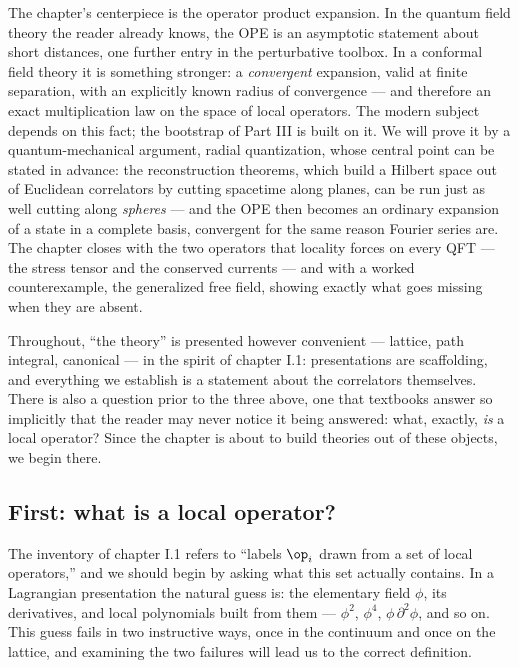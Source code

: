 \noin The chapter's centerpiece is the operator product expansion. In the
quantum field theory the reader already knows, the OPE is an asymptotic
statement about short distances, one further entry in the perturbative
toolbox. In a conformal field theory it is something stronger: a
\emph{convergent} expansion, valid at finite separation, with an explicitly
known radius of convergence --- and therefore an exact multiplication law on
the space of local operators. The modern subject depends on this fact; the
bootstrap of Part III is built on it. We will prove it by a
quantum-mechanical argument, radial quantization, whose central point can be
stated in advance: the reconstruction theorems, which build a Hilbert space
out of Euclidean correlators by cutting spacetime along planes, can be run
just as well cutting along \emph{spheres} --- and the OPE then becomes an
ordinary expansion of a state in a complete basis, convergent for the same
reason Fourier series are. The chapter closes with the two operators that
locality forces on every QFT --- the stress tensor and the conserved currents
--- and with a worked counterexample, the generalized free field, showing
exactly what goes missing when they are absent.

Throughout, ``the theory'' is presented however convenient --- lattice, path
integral, canonical --- in the spirit of chapter I.1: presentations are
scaffolding, and everything we establish is a statement about the correlators
themselves. There is also a question prior to the three above, one that
textbooks answer so implicitly that the reader may never notice it being
answered: what, exactly, \emph{is} a local operator? Since the chapter is
about to build theories out of these objects, we begin there.

\subsection{First: what is a local operator?}
\label{sec:what-is-operator}

The inventory of chapter I.1 refers to ``labels $\op_i$ drawn from a set of
local operators,'' and we should begin by asking what this set actually
contains. In a Lagrangian presentation the natural guess is: the elementary
field $\phi$, its derivatives, and local polynomials built from them ---
$\phi^2$, $\phi^4$, $\phi\,\partial^2\phi$, and so on. This guess fails in
two instructive ways, once in the continuum and once on the lattice, and
examining the two failures will lead us to the correct definition.


